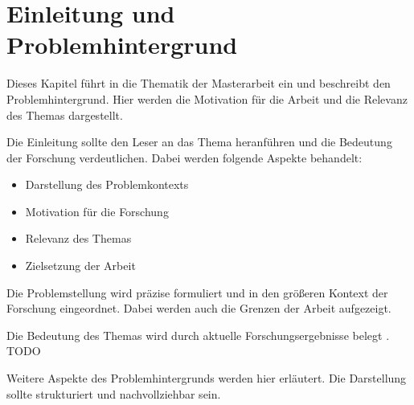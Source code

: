 
\chapter{Einleitung und Problemhintergrund}\label{cha:introduction}

Dieses Kapitel führt in die Thematik der Masterarbeit ein und beschreibt den Problemhintergrund. Hier werden die Motivation für die Arbeit und die Relevanz des Themas dargestellt.

Die Einleitung sollte den Leser an das Thema heranführen und die Bedeutung der Forschung verdeutlichen. Dabei werden folgende Aspekte behandelt:

\begin{itemize}[leftmargin=0.63cm, label=\textbullet]
    \item Darstellung des Problemkontexts
    \item Motivation für die Forschung
    \item Relevanz des Themas
    \item Zielsetzung der Arbeit
\end{itemize}

Die Problemstellung wird präzise formuliert und in den größeren Kontext der Forschung eingeordnet. Dabei werden auch die Grenzen der Arbeit aufgezeigt.

Die Bedeutung des Themas wird durch aktuelle Forschungsergebnisse belegt \cite{beispiel2024}.
TODO 

Weitere Aspekte des Problemhintergrunds werden hier erläutert. Die Darstellung sollte strukturiert und nachvollziehbar sein.

